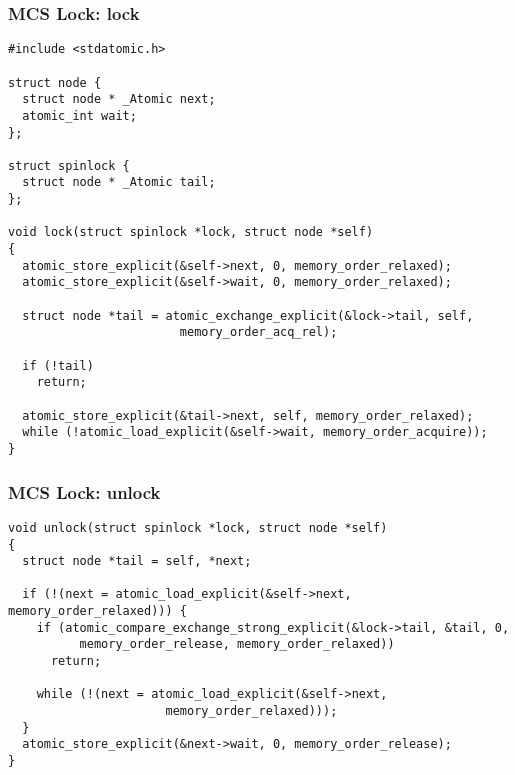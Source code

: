 \begin{frame}[fragile]
\frametitle{MCS Lock: lock}
\begin{lstlisting}
#include <stdatomic.h>

struct node {
  struct node * _Atomic next;
  atomic_int wait;
};

struct spinlock {
  struct node * _Atomic tail;
};

void lock(struct spinlock *lock, struct node *self)
{
  atomic_store_explicit(&self->next, 0, memory_order_relaxed);
  atomic_store_explicit(&self->wait, 0, memory_order_relaxed);

  struct node *tail = atomic_exchange_explicit(&lock->tail, self,
                        memory_order_acq_rel);

  if (!tail)
    return;

  atomic_store_explicit(&tail->next, self, memory_order_relaxed);
  while (!atomic_load_explicit(&self->wait, memory_order_acquire));
}
\end{lstlisting}
\end{frame}

\begin{frame}[fragile]
\frametitle{MCS Lock: unlock}
\begin{lstlisting}
void unlock(struct spinlock *lock, struct node *self)
{
  struct node *tail = self, *next;

  if (!(next = atomic_load_explicit(&self->next, memory_order_relaxed))) {
    if (atomic_compare_exchange_strong_explicit(&lock->tail, &tail, 0,
          memory_order_release, memory_order_relaxed))
      return;

    while (!(next = atomic_load_explicit(&self->next,
                      memory_order_relaxed)));
  }
  atomic_store_explicit(&next->wait, 0, memory_order_release);
}
\end{lstlisting}
\end{frame}

